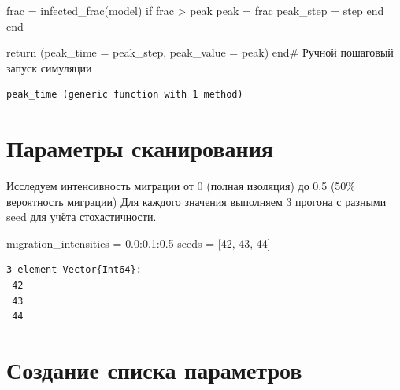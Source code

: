 \documentclass[
  12pt,
  a4paper,
  DIV=11,
  numbers=noendperiod]{scrreprt}
\newenvironment{Shaded}{\begin{snugshade}}{\end{snugshade}}
\newcommand{\CommentTok}[1]{\textcolor[rgb]{0.37,0.37,0.37}{#1}}
\newcommand{\ControlFlowTok}[1]{\textcolor[rgb]{0.00,0.23,0.31}{#1}}
\newcommand{\FloatTok}[1]{\textcolor[rgb]{0.68,0.00,0.00}{#1}}
\newcommand{\FunctionTok}[1]{\textcolor[rgb]{0.28,0.35,0.67}{#1}}
\newcommand{\KeywordTok}[1]{\textcolor[rgb]{0.00,0.23,0.31}{#1}}
\newcommand{\NormalTok}[1]{\textcolor[rgb]{0.00,0.23,0.31}{#1}}
\newcommand{\OperatorTok}[1]{\textcolor[rgb]{0.37,0.37,0.37}{#1}}
\begin{document}
\begin{Shaded}
\begin{Highlighting}[]
\NormalTok{        frac }\OperatorTok{=} \FunctionTok{infected\_frac}\NormalTok{(model)}
        \ControlFlowTok{if}\NormalTok{ frac }\OperatorTok{\textgreater{}}\NormalTok{ peak}
\NormalTok{            peak }\OperatorTok{=}\NormalTok{ frac}
\NormalTok{            peak\_step }\OperatorTok{=}\NormalTok{ step}
        \ControlFlowTok{end}
    \ControlFlowTok{end}

    \ControlFlowTok{return}\NormalTok{ (peak\_time }\OperatorTok{=}\NormalTok{ peak\_step, peak\_value }\OperatorTok{=}\NormalTok{ peak)}
\KeywordTok{end}\CommentTok{\# Ручной пошаговый запуск симуляции}
\end{Highlighting}
\end{Shaded}

\begin{verbatim}
peak_time (generic function with 1 method)
\end{verbatim}

\section{Параметры
сканирования}\label{ux43fux430ux440ux430ux43cux435ux442ux440ux44b-ux441ux43aux430ux43dux438ux440ux43eux432ux430ux43dux438ux44f-2}

Исследуем интенсивность миграции от 0 (полная изоляция) до 0.5 (50\%
вероятность миграции) Для каждого значения выполняем 3 прогона с разными
seed для учёта стохастичности.

\begin{Shaded}
\begin{Highlighting}[]
\NormalTok{migration\_intensities }\OperatorTok{=} \FloatTok{0.0}\OperatorTok{:}\FloatTok{0.1}\OperatorTok{:}\FloatTok{0.5}
\NormalTok{seeds }\OperatorTok{=}\NormalTok{ [}\FloatTok{42}\NormalTok{, }\FloatTok{43}\NormalTok{, }\FloatTok{44}\NormalTok{]}
\end{Highlighting}
\end{Shaded}

\begin{verbatim}
3-element Vector{Int64}:
 42
 43
 44
\end{verbatim}

\section{Создание списка
параметров}\label{ux441ux43eux437ux434ux430ux43dux438ux435-ux441ux43fux438ux441ux43aux430-ux43fux430ux440ux430ux43cux435ux442ux440ux43eux432-2}
\end{document}

